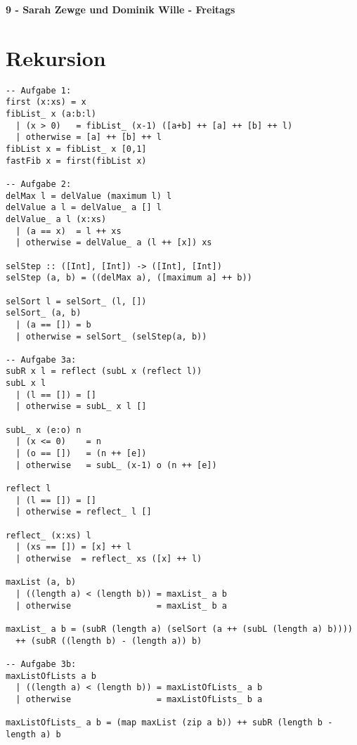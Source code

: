\documentclass[a4paper, parskip=half]{scrartcl}
\begin{document}
\textbf{\LARGE 9 - Sarah Zewge und Dominik Wille - Freitags}
  \section{Rekursion}
\begin{verbatim}
-- Aufgabe 1:
first (x:xs) = x
fibList_ x (a:b:l)
  | (x > 0)   = fibList_ (x-1) ([a+b] ++ [a] ++ [b] ++ l)
  | otherwise = [a] ++ [b] ++ l
fibList x = fibList_ x [0,1]
fastFib x = first(fibList x)

-- Aufgabe 2:
delMax l = delValue (maximum l) l
delValue a l = delValue_ a [] l
delValue_ a l (x:xs)
  | (a == x)  = l ++ xs
  | otherwise = delValue_ a (l ++ [x]) xs

selStep :: ([Int], [Int]) -> ([Int], [Int])
selStep (a, b) = ((delMax a), ([maximum a] ++ b))

selSort l = selSort_ (l, [])
selSort_ (a, b)
  | (a == []) = b
  | otherwise = selSort_ (selStep(a, b))

-- Aufgabe 3a:
subR x l = reflect (subL x (reflect l))
subL x l 
  | (l == []) = []
  | otherwise = subL_ x l []

subL_ x (e:o) n
  | (x <= 0)    = n
  | (o == [])   = (n ++ [e])
  | otherwise   = subL_ (x-1) o (n ++ [e])

reflect l
  | (l == []) = []
  | otherwise = reflect_ l []

reflect_ (x:xs) l 
  | (xs == []) = [x] ++ l
  | otherwise  = reflect_ xs ([x] ++ l)

maxList (a, b)
  | ((length a) < (length b)) = maxList_ a b
  | otherwise                 = maxList_ b a

maxList_ a b = (subR (length a) (selSort (a ++ (subL (length a) b)))) 
  ++ (subR ((length b) - (length a)) b)

-- Aufgabe 3b:
maxListOfLists a b
  | ((length a) < (length b)) = maxListOfLists_ a b
  | otherwise                 = maxListOfLists_ b a

maxListOfLists_ a b = (map maxList (zip a b)) ++ subR (length b - length a) b
\end{verbatim}
\end{document}
